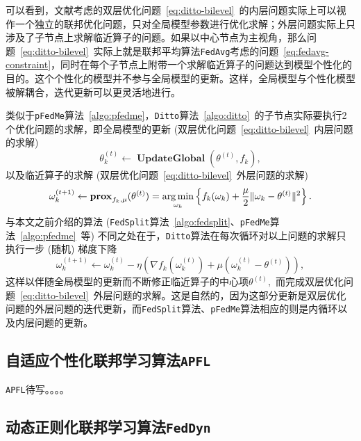 可以看到，文献\parencite{li_2021_ditto}考虑的双层优化问题~\eqref{eq:ditto-bilevel}~的内层问题实际上可以视作一个独立的联邦优化问题，只对全局模型参数进行优化求解；外层问题实际上只涉及了子节点上求解临近算子的问题。如果以中心节点为主视角，那么问题~\eqref{eq:ditto-bilevel}~实际上就是联邦平均算法\texttt{FedAvg}考虑的问题~\eqref{eq:fedavg-constraint}，同时在每个子节点上附带一个求解临近算子的问题达到模型个性化的目的。这个个性化的模型并不参与全局模型的更新。这样，全局模型与个性化模型被解耦合，迭代更新可以更灵活地进行。

类似于\texttt{pFedMe}算法~\ref{algo:pfedme}，\texttt{Ditto}算法~\ref{algo:ditto}~的子节点实际要执行2个优化问题的求解，即全局模型的更新 (双层优化问题~\eqref{eq:ditto-bilevel}~内层问题的求解)
\begin{equation}
\label{eq:ditto-global}
\theta_k^{(t)} \gets \operatorname{\mathbf{UpdateGlobal}}(\theta^{(t)}, f_k),
\end{equation}
以及临近算子的求解 (双层优化问题~\eqref{eq:ditto-bilevel}~外层问题的求解)
\begin{equation}
\label{eq:ditto-local-1}
\omega_k^{(t+1)} \gets \mathbf{prox}_{f_k, \mu} (\theta^{(t)}) = \operatorname*{arg\,min}\limits_{\omega_k} \left\{ f_k(\omega_k) + \frac{\mu}{2} \lVert \omega_k - \theta^{(t)} \rVert^2 \right\}.
\end{equation}
与本文之前介绍的算法 (\texttt{FedSplit}算法~\ref{algo:fedsplit}、\texttt{pFedMe}算法~\ref{algo:pfedme}~等) 不同之处在于，\texttt{Ditto}算法在每次循环对以上问题的求解只执行一步 (随机) 梯度下降
\begin{equation}
\label{eq:ditto-local-2}
\omega_k^{(t+1)} \gets \omega_k^{(t)} - \eta \left( \nabla f_k(\omega_k^{(t)}) + \mu (\omega_k^{(t)} - \theta^{(t)}) \right),
\end{equation}
这样以伴随全局模型的更新而不断修正临近算子的中心项$\theta^{(t)},$ 而完成双层优化问题~\eqref{eq:ditto-bilevel}~外层问题的求解。这是自然的，因为这部分更新是双层优化问题的外层问题的迭代更新，而\texttt{FedSplit}算法、\texttt{pFedMe}算法相应的则是内循环以及内层问题的更新。

\subsection*{自适应个性化联邦学习算法\texttt{APFL}}

\parencite{deng2020_apfl}  \texttt{APFL}待写。。。。



\subsection*{动态正则化联邦学习算法\texttt{FedDyn}}

